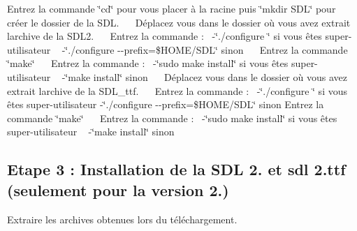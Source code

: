  Entrez la commande \char`\"{}cd\char`\"{} pour vous placer à la racine puis \char`\"{}mkdir S\+D\+L\char`\"{} pour créer le dossier de la S\+DL.~\newline
~\newline
 Déplacez vous dans le dossier où vous avez extrait l\textquotesingle{}archive de la S\+D\+L2.~\newline
~\newline
 Entrez la commande \+:~\newline
 -\/\char`\"{}./configure \char`\"{} si vous êtes super-\/utilisateur ~\newline
 -\/\char`\"{}./configure -\/-\/prefix=\$\+H\+O\+M\+E/\+S\+D\+L\char`\"{} sinon~\newline
~\newline
 Entrez la commande \char`\"{}make\char`\"{}~\newline
~\newline
 Entrez la commande \+:~\newline
 -\/\char`\"{}sudo make install\char`\"{} si vous êtes super-\/utilisateur ~\newline
 -\/\char`\"{}make install\char`\"{} sinon~\newline
~\newline
 Déplacez vous dans le dossier où vous avez extrait l\textquotesingle{}archive de la S\+D\+L\+\_\+ttf.~\newline
~\newline
 Entrez la commande \+:~\newline
 -\/\char`\"{}./configure \char`\"{} si vous êtes super-\/utilisateur -\/\char`\"{}./configure -\/-\/prefix=\$\+H\+O\+M\+E/\+S\+D\+L\char`\"{} sinon Entrez la commande \char`\"{}make\char`\"{}~\newline
~\newline
 Entrez la commande \+:~\newline
 -\/\char`\"{}sudo make install\char`\"{} si vous êtes super-\/utilisateur ~\newline
 -\/\char`\"{}make install\char`\"{} sinon~\newline
~\newline
\hypertarget{index_step3}{}\subsection{Etape 3 \+: Installation de la S\+D\+L 2. et sdl 2.\+ttf (seulement pour la version 2.)}\label{index_step3}
Extraire les archives obtenues lors du téléchargement.~\newline
